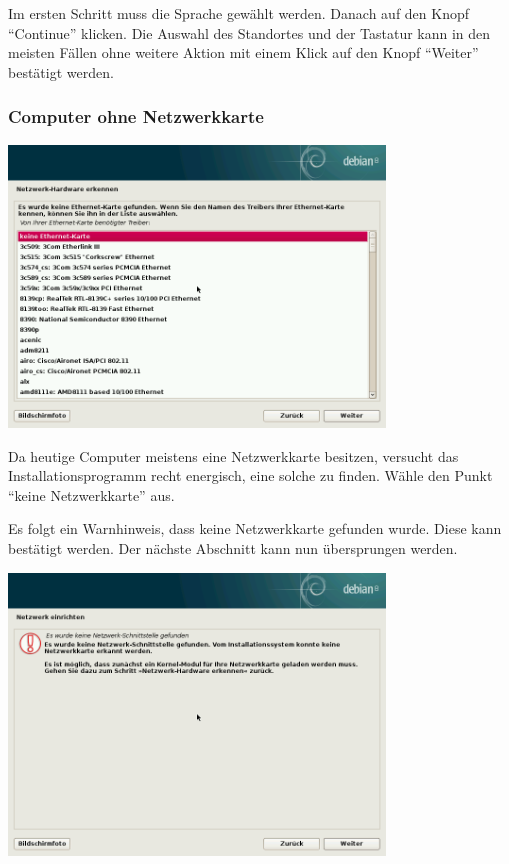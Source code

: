 \documentclass[a4paper,12pt,twoside]{article}
\begin{document}
Im ersten Schritt muss die Sprache gewählt werden. Danach auf den Knopf
"`Continue"' klicken. Die Auswahl des
Standortes und der Tastatur kann in den meisten Fällen ohne weitere
Aktion mit einem Klick auf den Knopf
"`Weiter"' bestätigt werden.


\subsubsection{Computer ohne Netzwerkkarte}
\label{sct:inst_ohne_netzwerk}

\begin{minipage}{\linewidth}
  \centering
  \includegraphics[width=10cm]{screenshots/select_network_card.png}
  \label{fig:inst_netzwerkkarte}
\end{minipage}

Da heutige Computer meistens eine Netzwerkkarte besitzen, versucht das
Installationsprogramm recht energisch, eine solche zu finden. Wähle den
Punkt "`keine Netzwerkkarte"' aus.

Es folgt ein Warnhinweis, dass keine Netzwerkkarte gefunden wurde. Diese
kann bestätigt werden. Der nächste Abschnitt kann nun übersprungen
werden.

\begin{minipage}{\linewidth}
  \centering
  \includegraphics[width=10cm]{screenshots/message_no_network.png}
  \label{fig:inst_best_netzwerkkarte}
\end{minipage}
\end{document}
